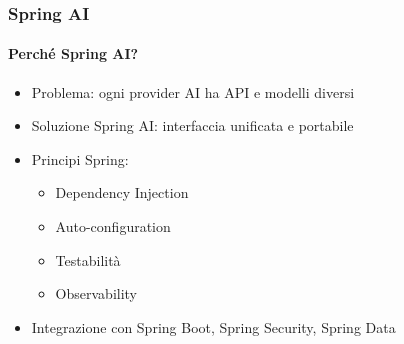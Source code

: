 %
\begin{frame}[t,fragile] \frametitle{Spring AI}
	{\scriptsize
		\onslide<1->
            \framesubtitle{Perché Spring AI?}
            \vspace*{-10pt}
	    	\begin{minipage}[t]{\textwidth}
				\begin{minipage}[t]{0.6\textwidth}
	    			\begin{itemize}[leftmargin=10pt,align=right]
						\onslide<2->\item[\alert{\faArrowCircleRight}] \alert{Problema:} ogni provider AI ha API e modelli diversi
						\onslide<3->\item[\alert{\faArrowCircleRight}] \alert{Soluzione Spring AI:} interfaccia unificata e portabile
						\onslide<4->\item[\alert{\faArrowCircleRight}] \alert{Principi Spring:}
						\begin{itemize}[leftmargin=10pt,align=right]
							\item[\alert{\faArrowCircleRight}] Dependency Injection
							\item[\alert{\faArrowCircleRight}] Auto-configuration
							\item[\alert{\faArrowCircleRight}] Testabilità
							\item[\alert{\faArrowCircleRight}] Observability
						\end{itemize}
						\item[\alert{\faArrowCircleRight}] \alert{Integrazione} con Spring Boot, Spring Security, Spring Data
					\end{itemize}
            	\end{minipage}
            	\begin{minipage}[t]{0.4\textwidth}
            	\end{minipage}
	    	\end{minipage}
	}
\end{frame}
%
